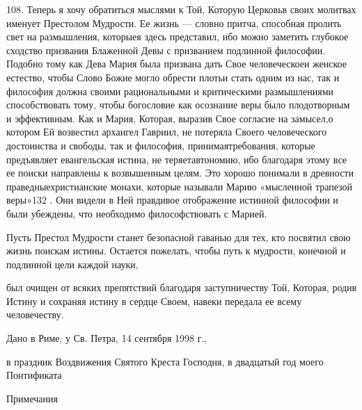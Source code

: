 \documentclass[a5paper,10pt]{article}
\begin{document}
108. Теперь я хочу обратиться мыслями к Той, Которую Церковьв своих молитвах
именует Престолом Мудрости. Ее жизнь — словно притча, способная пролить свет на
размышления, которыея здесь представил, ибо можно заметить глубокое сходство
призвания Блаженной Девы с призванием подлинной философии. Подобно тому как
Дева Мария была призвана дать Свое человеческоеи женское естество, чтобы Слово
Божие могло обрести плотьи стать одним из нас, так и философия должна своими
рациональными и критическими размышлениями способствовать тому, чтобы
богословие как осознание веры было плодотворным и эффективным. Как и Мария,
Которая, выразив Свое согласие на замысел,о котором Ей возвестил архангел
Гавриил, не потеряла Своего человеческого достоинства и свободы, так и
философия, принимаятребования, которые предъявляет евангельская истина, не
теряетавтономию, ибо благодаря этому все ее поиски направлены к возвышенным
целям. Это хорошо понимали в древности праведныехристианские монахи, которые
называли Марию «мысленной трапезой веры»132 . Они видели в Ней правдивое
отображение истинной философии и были убеждены, что необходимо философствовать
с Марией.

Пусть Престол Мудрости станет безопасной гаванью для тех, кто посвятил свою
жизнь поискам истины. Остается пожелать, чтобы путь к мудрости, конечной и
подлинной цели каждой науки,

был очищен от всяких препятствий благодаря заступничеству Той, Которая, родив
Истину и сохраняя истину в сердце Своем, навеки передала ее всему человечеству.

Дано в Риме, у Св. Петра, 14 сентября 1998 г.,

в праздник Воздвижения Святого Креста Господня, в двадцатый год моего
Понтификата

Примечания
\end{document}
